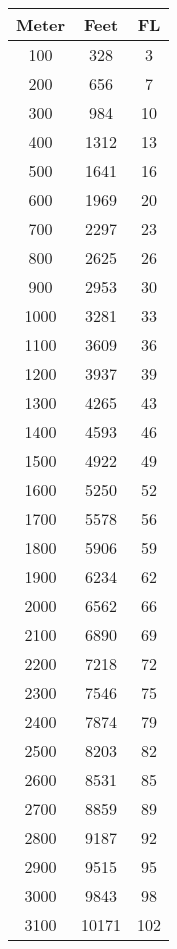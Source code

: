 \begin{table}[!ht]
  \centering
  \tiny
  \begin{tabular}{|c|c|c|}
  \hline
  \cellcolor{black!90}\color{white}\textbf{Meter} & \cellcolor{black!90}\color{white}\textbf{Feet} & \cellcolor{black!90}\color{white}\textbf{FL} \\ \hline
      100 & 328 & 3 \\ \hline
      200 & 656 & 7 \\ \hline
      300 & 984 & 10 \\ \hline
      400 & 1312 & 13 \\ \hline
      500 & 1641 & 16 \\ \hline
      600 & 1969 & 20 \\ \hline
      700 & 2297 & 23 \\ \hline
      800 & 2625 & 26 \\ \hline
      900 & 2953 & 30 \\ \hline
      1000 & 3281 & 33 \\ \hline
      1100 & 3609 & 36 \\ \hline
      1200 & 3937 & 39 \\ \hline
      1300 & 4265 & 43 \\ \hline
      1400 & 4593 & 46 \\ \hline
      1500 & 4922 & 49 \\ \hline
      1600 & 5250 & 52 \\ \hline
      1700 & 5578 & 56 \\ \hline
      1800 & 5906 & 59 \\ \hline
      1900 & 6234 & 62 \\ \hline
      2000 & 6562 & 66 \\ \hline
      2100 & 6890 & 69 \\ \hline
      2200 & 7218 & 72 \\ \hline
      2300 & 7546 & 75 \\ \hline
      2400 & 7874 & 79 \\ \hline
      2500 & 8203 & 82 \\ \hline
      2600 & 8531 & 85 \\ \hline
      2700 & 8859 & 89 \\ \hline
      2800 & 9187 & 92 \\ \hline
      2900 & 9515 & 95 \\ \hline
      3000 & 9843 & 98 \\ \hline
      3100 & 10171 & 102 \\ \hline

\end{tabular}
\end{table}
